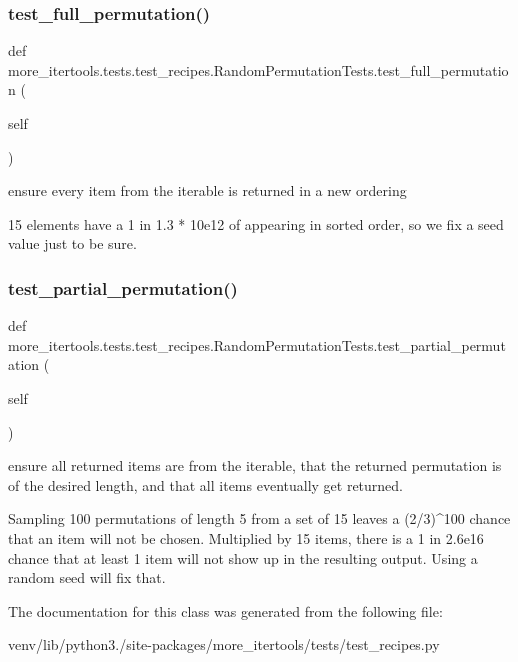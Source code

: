 \subsubsection{\texorpdfstring{test\+\_\+full\+\_\+permutation()}{test\_full\_permutation()}}
{\footnotesize\ttfamily def more\+\_\+itertools.\+tests.\+test\+\_\+recipes.\+Random\+Permutation\+Tests.\+test\+\_\+full\+\_\+permutation (\begin{DoxyParamCaption}\item[{}]{self }\end{DoxyParamCaption})}

\begin{DoxyVerb}ensure every item from the iterable is returned in a new ordering

15 elements have a 1 in 1.3 * 10e12 of appearing in sorted order, so
we fix a seed value just to be sure.\end{DoxyVerb}
 \mbox{\label{classmore__itertools_1_1tests_1_1test__recipes_1_1_random_permutation_tests_a7bde91b775e55e70ccfc03ddf8af9557}} 
\subsubsection{\texorpdfstring{test\+\_\+partial\+\_\+permutation()}{test\_partial\_permutation()}}
{\footnotesize\ttfamily def more\+\_\+itertools.\+tests.\+test\+\_\+recipes.\+Random\+Permutation\+Tests.\+test\+\_\+partial\+\_\+permutation (\begin{DoxyParamCaption}\item[{}]{self }\end{DoxyParamCaption})}

\begin{DoxyVerb}ensure all returned items are from the iterable, that the returned
permutation is of the desired length, and that all items eventually
get returned.

Sampling 100 permutations of length 5 from a set of 15 leaves a
(2/3)^100 chance that an item will not be chosen. Multiplied by 15
items, there is a 1 in 2.6e16 chance that at least 1 item will not
show up in the resulting output. Using a random seed will fix that.\end{DoxyVerb}
 

The documentation for this class was generated from the following file\+:\begin{DoxyCompactItemize}
\item 
venv/lib/python3./site-\/packages/more\+\_\+itertools/tests/test\+\_\+recipes.\+py\end{DoxyCompactItemize}
